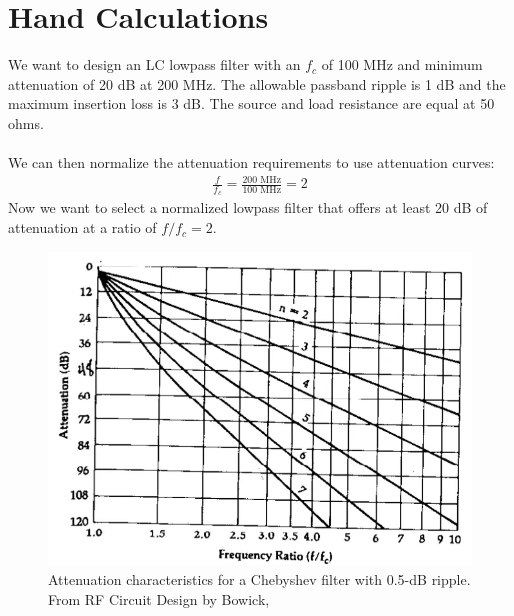 \documentclass[letterpaper,12pt]{article}
\begin{document}
\newpage
\section{Hand Calculations\label{sec:hand_calcs}}
We want to design an LC lowpass filter with an $f_c$ of 100 MHz and minimum attenuation of 20 dB at 200 MHz. The allowable passband ripple is 1 dB and the maximum insertion loss is 3 dB. The source and load resistance are equal at 50 ohms. \\
\\
We can then normalize the attenuation requirements to use attenuation curves:
\begin{align*}
    \frac{f}{f_c} = \frac{200 \text{ MHz}}{100 \text{ MHz}} = 2
\end{align*}
Now we want to select a normalized lowpass filter that offers at least 20 dB of attenuation at a ratio of $f/f_c = 2$.
\begin{figure}[H] 
    \centering \includegraphics[width=0.5\columnwidth]{figures/3.attenuation_characteristics}
    \caption{
            \label{fig:2.attenuation_characteristics}
            Attenuation characteristics for a Chebyshev filter with 0.5-dB ripple. From RF Circuit Design by Bowick, \cite{Bowick2007-br}
    }
\end{figure}
\end{document}
